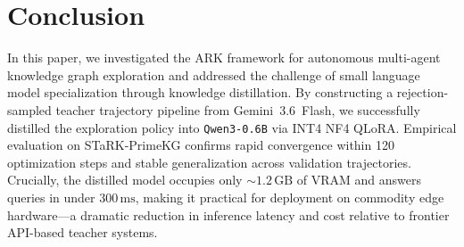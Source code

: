 \documentclass[11pt]{article}
\begin{document}
\section{Conclusion}
\label{sec:conclusion}
In this paper, we investigated the ARK framework for autonomous multi-agent knowledge graph exploration and addressed the challenge of small language model specialization through knowledge distillation. By constructing a rejection-sampled teacher trajectory pipeline from Gemini~3.6~Flash, we successfully distilled the exploration policy into \texttt{Qwen3-0.6B} via INT4 NF4 QLoRA. Empirical evaluation on STaRK-PrimeKG confirms rapid convergence within 120 optimization steps and stable generalization across validation trajectories. Crucially, the distilled model occupies only $\sim 1.2\,\text{GB}$ of VRAM and answers queries in under $300\,\text{ms}$, making it practical for deployment on commodity edge hardware---a dramatic reduction in inference latency and cost relative to frontier API-based teacher systems.


\end{document}

